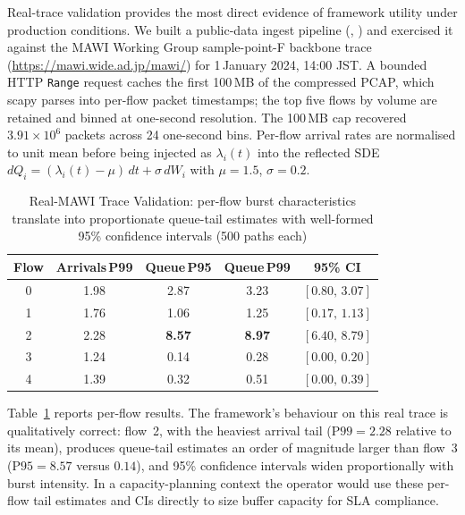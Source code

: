 \documentclass{ieeeaccess}
\begin{document}
Real-trace validation provides the most direct evidence of framework utility under production conditions.
We built a public-data ingest pipeline (,
) and exercised it against the MAWI Working Group
sample-point-F backbone trace (\url{https://mawi.wide.ad.jp/mawi/}) for 1\,January 2024,
14:00 JST. A bounded HTTP \texttt{Range} request caches the first 100\,MB of the compressed
PCAP, which scapy parses into per-flow packet timestamps; the top five flows by volume are
retained and binned at one-second resolution. The 100\,MB cap recovered $3.91\times10^{6}$
packets across 24 one-second bins. Per-flow arrival rates are normalised to unit mean before
being injected as $\lambda_i(t)$ into the reflected SDE
$dQ_i = (\lambda_i(t)-\mu)\,dt + \sigma\,dW_i$ with $\mu=1.5$, $\sigma=0.2$.

\begin{table}[!t]
\caption{Real-MAWI Trace Validation: per-flow burst characteristics translate into proportionate
queue-tail estimates with well-formed 95\% confidence intervals (500 paths each)}
\label{tab:mawi_validation}
\centering
\begin{tabular}{@{}c c c c c@{}}
\toprule
Flow & Arrivals\,P99 & Queue\,P95 & Queue\,P99 & 95\% CI \\
\midrule
0 & 1.98 & 2.87 & 3.23 & $[0.80,\,3.07]$ \\
1 & 1.76 & 1.06 & 1.25 & $[0.17,\,1.13]$ \\
2 & 2.28 & \textbf{8.57} & \textbf{8.97} & $[6.40,\,8.79]$ \\
3 & 1.24 & 0.14 & 0.28 & $[0.00,\,0.20]$ \\
4 & 1.39 & 0.32 & 0.51 & $[0.00,\,0.39]$ \\
\bottomrule
\end{tabular}
\end{table}

Table~\ref{tab:mawi_validation} reports per-flow results. The framework's behaviour on this real
trace is qualitatively correct: flow~2, with the heaviest arrival tail ($\mathrm{P99}=2.28$
relative to its mean), produces queue-tail estimates an order of magnitude larger than flow~3
($\mathrm{P95}=8.57$ versus $0.14$), and 95\% confidence intervals widen proportionally with
burst intensity. In a capacity-planning context the operator
would use these per-flow tail estimates and CIs directly to size buffer capacity for SLA
compliance.
\end{document}
